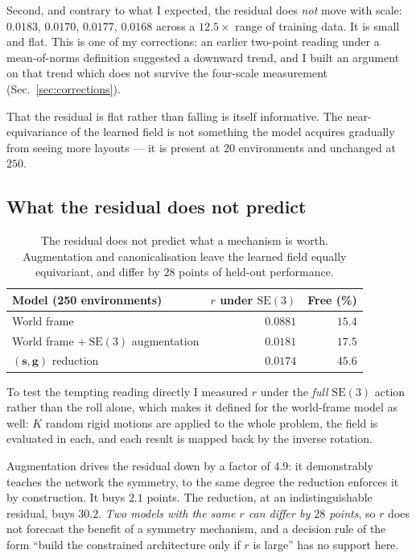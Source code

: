 \documentclass[11pt,a4paper]{article}
\newcommand{\toprule}{\hline}
\newcommand{\midrule}{\hline}
\newcommand{\bottomrule}{\hline}
\newcommand{\svec}{\mathbf{s}}
\newcommand{\gvec}{\mathbf{g}}
\newcommand{\SE}{\mathrm{SE}(3)}
\begin{document}
Second, and contrary to what I expected, the residual does \emph{not} move with
scale: $0.0183$, $0.0170$, $0.0177$, $0.0168$ across a $12.5\times$ range of
training data. It is small and flat. This is one of my corrections: an earlier
two-point reading under a mean-of-norms definition suggested a downward trend,
and I built an argument on that trend which does not survive the four-scale
measurement (Sec.~\ref{sec:corrections}).

That the residual is flat rather than falling is itself informative. The
near-equivariance of the learned field is not something the model acquires
gradually from seeing more layouts --- it is present at $20$ environments and
unchanged at $250$.

\subsection{What the residual does not predict}
\label{sec:twosigns}

\begin{table}[t]
\centering
\begin{tabular}{lrr}
\toprule
Model (250 environments) & $r$ under $\SE$ & Free (\%) \\
\midrule
World frame                       & $0.0881$ & $15.4$ \\
World frame $+\ \SE$ augmentation & $0.0181$ & $17.5$ \\
$(\svec,\gvec)$ reduction         & $0.0174$ & $\mathbf{45.6}$ \\
\bottomrule
\end{tabular}
\caption{The residual does not predict what a mechanism is worth. Augmentation
and canonicalisation leave the learned field equally equivariant, and differ by
$28$ points of held-out performance.}
\label{tab:twosigns}
\end{table}

To test the tempting reading directly I measured $r$ under the \emph{full} $\SE$
action rather than the roll alone, which makes it defined for the world-frame model
as well: $K$ random rigid motions are applied to the whole problem, the field is
evaluated in each, and each result is mapped back by the inverse rotation.

Augmentation drives the residual down by a factor of $4.9$: it demonstrably
teaches the network the symmetry, to the same degree the reduction enforces it by
construction. It buys $2.1$ points. The reduction, at an indistinguishable
residual, buys $30.2$. \emph{Two models with the same $r$ can differ by $28$
points}, so $r$ does not forecast the benefit of a symmetry mechanism, and a
decision rule of the form ``build the constrained architecture only if $r$ is
large'' has no support here.
\end{document}
